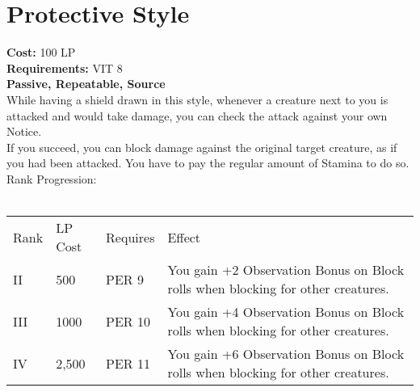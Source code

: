 \section{Protective Style}\label{perk:protectiveStyle}
\textbf{Cost:} 100 LP\\
\textbf{Requirements:} VIT 8\\
\textbf{Passive, Repeatable, Source}\\
While having a shield drawn in this style, whenever a creature next to you is attacked and would take damage, you can check the attack against your own Notice.\\
If you succeed, you can block damage against the original target creature, as if you had been attacked.
You have to pay the regular amount of Stamina to do so.\\
Rank Progression:\\
\\
\begin{tabular}{l | l | l | l}
    Rank & LP Cost & Requires & Effect\\
    II & 500 & PER 9 & You gain +2 Observation Bonus on Block rolls when blocking for other creatures.\\
    III & 1000 & PER 10 & You gain +4 Observation Bonus on Block rolls when blocking for other creatures.\\
    IV & 2,500 & PER 11 & You gain +6 Observation Bonus on Block rolls when blocking for other creatures.\\
\end{tabular}